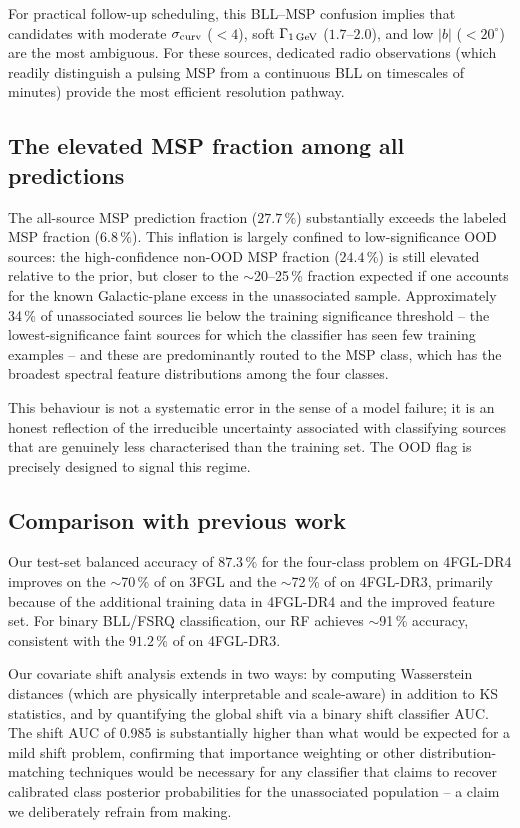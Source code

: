 \documentclass[fleqn,12pt]{article}
\newcommand{\fgl}{4FGL-DR4}
\newcommand{\sigs}{\sigma_{\rm curv}}
\newcommand{\GamLP}{\Gamma_{\rm 1\,GeV}}
\newcommand{\GALL}{|b|}
\begin{document}
For practical follow-up scheduling, this BLL--MSP confusion implies
that candidates with moderate $\sigs$ ($< 4$), soft $\GamLP$
($1.7$--$2.0$), and low $\GALL$ ($< 20^\circ$) are the most
ambiguous. For these sources, dedicated radio observations (which
readily distinguish a pulsing MSP from a continuous BLL on timescales
of minutes) provide the most efficient resolution pathway.

\subsection{The elevated MSP fraction among all predictions}
\label{ssec:disc_msp}

The all-source MSP prediction fraction ($27.7\,\%$) substantially
exceeds the labeled MSP fraction ($6.8\,\%$). This inflation is
largely confined to low-significance OOD sources: the high-confidence
non-OOD MSP fraction ($24.4\,\%$) is still elevated relative to the
prior, but closer to the $\sim$20--25\,\% fraction expected if one
accounts for the known Galactic-plane excess in the unassociated
sample. Approximately 34\,\% of unassociated sources lie below the
training significance threshold -- the lowest-significance faint
sources for which the classifier has seen few training examples --
and these are predominantly routed to the MSP class, which has the
broadest spectral feature distributions among the four classes.

This behaviour is not a systematic error in the sense of a model
failure; it is an honest reflection of the irreducible uncertainty
associated with classifying sources that are genuinely less
characterised than the training set. The OOD flag is precisely
designed to signal this regime.

\subsection{Comparison with previous work}
\label{ssec:disc_compare}

Our test-set balanced accuracy of $87.3\,\%$ for the four-class
problem on \fgl{} improves on the $\sim$70\,\% of
\citet{Saz_Parkinson2016} on 3FGL and the $\sim$72\,\% of
\citet{Zhu2024} on 4FGL-DR3, primarily because of the additional
training data in \fgl{} and the improved feature set. For binary
BLL/FSRQ classification, our RF achieves $\sim$91\,\% accuracy,
consistent with the $91.2\,\%$ of \citet{Cooper2023} on 4FGL-DR3.

Our covariate shift analysis extends \citet{MalyshevRASTI2023} in two
ways: by computing Wasserstein distances (which are physically
interpretable and scale-aware) in addition to KS statistics, and by
quantifying the global shift via a binary shift classifier AUC.
The shift AUC of 0.985 is substantially higher than what would be
expected for a mild shift problem, confirming that importance
weighting or other distribution-matching techniques would be necessary
for any classifier that claims to recover calibrated class posterior
probabilities for the unassociated population -- a claim we
deliberately refrain from making.
\end{document}
